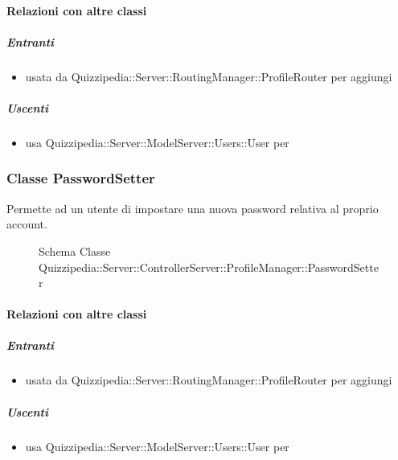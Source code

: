 \paragraph{Relazioni con altre classi}
\subparagraph{Entranti}
\begin{itemize}
\item usata da Quizzipedia::Server::RoutingManager::ProfileRouter per aggiungi
\end{itemize}
\subparagraph{Uscenti}
\begin{itemize}
\item usa Quizzipedia::Server::ModelServer::Users::User per 
\end{itemize}
\subsubsection{Classe PasswordSetter}
Permette ad un utente di impostare una nuova password relativa al proprio account.
\begin{figure}[H]
\centering
\noindent{}
\caption[Schema Classe PasswordSetter]{Schema Classe Quizzipedia::Server::ControllerServer::ProfileManager::PasswordSetter}
\end{figure}
\paragraph{Relazioni con altre classi}
\subparagraph{Entranti}
\begin{itemize}
\item usata da Quizzipedia::Server::RoutingManager::ProfileRouter per aggiungi
\end{itemize}
\subparagraph{Uscenti}
\begin{itemize}
\item usa Quizzipedia::Server::ModelServer::Users::User per 
\end{itemize}
